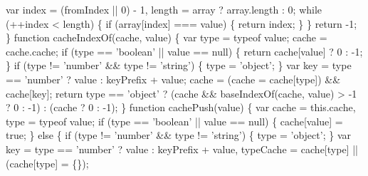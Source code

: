 \begin{DoxyCodeInclude}
\textcolor{stringliteral}{    var index = (fromIndex || 0) - 1,}
\textcolor{stringliteral}{        length = array ? array.length : 0;}
\textcolor{stringliteral}{}
\textcolor{stringliteral}{    while (++index < length) \{}
\textcolor{stringliteral}{      if (array[index] === value) \{}
\textcolor{stringliteral}{        return index;}
\textcolor{stringliteral}{      \}}
\textcolor{stringliteral}{    \}}
\textcolor{stringliteral}{    return -1;}
\textcolor{stringliteral}{  \}}
\textcolor{stringliteral}{}
\textcolor{stringliteral}{  function cacheIndexOf(cache, value) \{}
\textcolor{stringliteral}{    var type = typeof value;}
\textcolor{stringliteral}{    cache = cache.cache;}
\textcolor{stringliteral}{}
\textcolor{stringliteral}{    if (type == '}\textcolor{keywordtype}{boolean}\textcolor{stringliteral}{' || value == null) \{}
\textcolor{stringliteral}{      return cache[value] ? 0 : -1;}
\textcolor{stringliteral}{    \}}
\textcolor{stringliteral}{    if (type != '}number\textcolor{stringliteral}{' && type != '}\textcolor{keywordtype}{string}\textcolor{stringliteral}{') \{}
\textcolor{stringliteral}{      type = '}\textcolor{keywordtype}{object}\textcolor{stringliteral}{';}
\textcolor{stringliteral}{    \}}
\textcolor{stringliteral}{    var key = type == '}number\textcolor{stringliteral}{' ? value : keyPrefix + value;}
\textcolor{stringliteral}{    cache = (cache = cache[type]) && cache[key];}
\textcolor{stringliteral}{}
\textcolor{stringliteral}{    return type == '}\textcolor{keywordtype}{object}\textcolor{stringliteral}{'}
\textcolor{stringliteral}{      ? (cache && baseIndexOf(cache, value) > -1 ? 0 : -1)}
\textcolor{stringliteral}{      : (cache ? 0 : -1);}
\textcolor{stringliteral}{  \}}
\textcolor{stringliteral}{}
\textcolor{stringliteral}{  function cachePush(value) \{}
\textcolor{stringliteral}{    var cache = this.cache,}
\textcolor{stringliteral}{        type = typeof value;}
\textcolor{stringliteral}{}
\textcolor{stringliteral}{    if (type == '}\textcolor{keywordtype}{boolean}\textcolor{stringliteral}{' || value == null) \{}
\textcolor{stringliteral}{      cache[value] = true;}
\textcolor{stringliteral}{    \} else \{}
\textcolor{stringliteral}{      if (type != '}number\textcolor{stringliteral}{' && type != '}\textcolor{keywordtype}{string}\textcolor{stringliteral}{') \{}
\textcolor{stringliteral}{        type = '}\textcolor{keywordtype}{object}\textcolor{stringliteral}{';}
\textcolor{stringliteral}{      \}}
\textcolor{stringliteral}{      var key = type == '}number\textcolor{stringliteral}{' ? value : keyPrefix + value,}
\textcolor{stringliteral}{          typeCache = cache[type] || (cache[type] = \{\});}

\end{DoxyCodeInclude}
